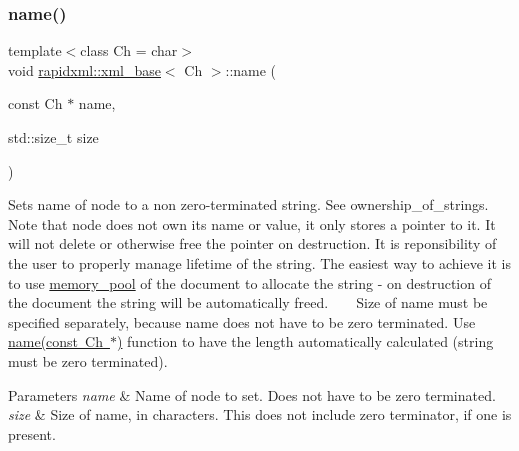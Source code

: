 \subsubsection{\texorpdfstring{name()}{name()}\hspace{0.1cm}{\footnotesize\ttfamily [3/6]}}
{\footnotesize\ttfamily template$<$class Ch  = char$>$ \\
void \mbox{\hyperlink{classrapidxml_1_1xml__base}{rapidxml\+::xml\+\_\+base}}$<$ Ch $>$\+::name (\begin{DoxyParamCaption}\item[{const Ch $\ast$}]{name,  }\item[{std\+::size\+\_\+t}]{size }\end{DoxyParamCaption})\hspace{0.3cm}{\ttfamily [inline]}}

Sets name of node to a non zero-\/terminated string. See ownership\+\_\+of\+\_\+strings. ~\newline
~\newline
 Note that node does not own its name or value, it only stores a pointer to it. It will not delete or otherwise free the pointer on destruction. It is reponsibility of the user to properly manage lifetime of the string. The easiest way to achieve it is to use \mbox{\hyperlink{classrapidxml_1_1memory__pool}{memory\+\_\+pool}} of the document to allocate the string -\/ on destruction of the document the string will be automatically freed. ~\newline
~\newline
 Size of name must be specified separately, because name does not have to be zero terminated. Use \mbox{\hyperlink{classrapidxml_1_1xml__base_a4611ddc82ac83a527c65606600eb2a0d}{name(const Ch $\ast$)}} function to have the length automatically calculated (string must be zero terminated). 
\begin{DoxyParams}{Parameters}
{\em name} & Name of node to set. Does not have to be zero terminated. \\
\hline
{\em size} & Size of name, in characters. This does not include zero terminator, if one is present. \\
\hline
\end{DoxyParams}
\mbox{\label{classrapidxml_1_1xml__base_ae55060ae958c6e6465d6c8db852ec6ce}} 
